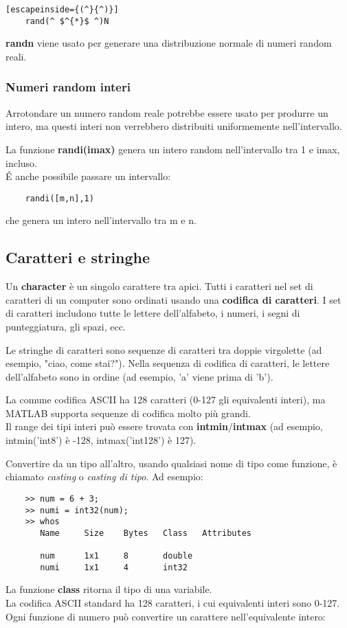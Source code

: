 \documentclass[a4paper, 10pt]{article}
\begin{document}
	\begin{lstlisting}[escapeinside={(^}{^)}]
	rand(^ $^{*}$ ^)N
	\end{lstlisting}
\textbf{randn} viene usato per generare una distribuzione normale di numeri random reali.

\subsubsection{Numeri random interi}
Arrotondare un numero random reale potrebbe essere usato per produrre un intero, ma questi interi non verrebbero distribuiti uniformemente nell'intervallo.

La funzione \textbf{randi(imax)} genera un intero random nell'intervallo tra 1 e imax, incluso.\\
\'{E} anche possibile passare un intervallo:

	\begin{lstlisting}
	randi([m,n],1)
	\end{lstlisting}
che genera un intero nell'intervallo tra m e n.

\subsection{Caratteri e stringhe}
Un \textbf{character} è un singolo carattere tra apici.
Tutti i caratteri nel set di caratteri di un computer sono ordinati usando una \textbf{codifica di caratteri}.
I set di caratteri includono tutte le lettere dell'alfabeto, i numeri, i segni di punteggiatura, gli spazi, ecc. 

Le stringhe di caratteri sono sequenze di caratteri tra doppie virgolette (ad esempio, "ciao, come stai?"). Nella sequenza di codifica di caratteri, le lettere dell'alfabeto sono in ordine (ad esempio, 'a' viene prima di 'b'). 

La comune codifica ASCII ha 128 caratteri (0-127 gli equivalenti interi), ma MATLAB supporta sequenze di codifica molto più grandi.\\
Il range dei tipi interi può essere trovata con \textbf{intmin}/\textbf{intmax} (ad esempio, intmin('int8') è -128, intmax('int128') è 127).

Convertire da un tipo all'altro, usando qualsiasi nome di tipo come funzione, è chiamato \textit{casting} o \textit{casting di tipo}. Ad esempio:

	\begin{lstlisting}
	>> num = 6 + 3;
	>> numi = int32(num);
	>> whos
	   Name		Size	Bytes	Class	Attributes

	   num		1x1		8		double
	   numi		1x1		4		int32
	\end{lstlisting}
\medskip
La funzione \textbf{class} ritorna il tipo di una variabile.\\
La codifica ASCII standard ha 128 caratteri, i cui equivalenti interi sono 0-127.\\
Ogni funzione di numero può convertire un carattere nell'equivalente intero:
\end{document}
